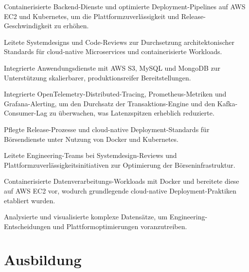 \documentclass[10pt,a4paper]{resume}
\begin{document}
\bullets
  \item Containerisierte Backend-Dienste und optimierte Deployment-Pipelines auf AWS EC2 und Kubernetes, um die Plattformzuverlässigkeit und Release-Geschwindigkeit zu erhöhen.
  \item Leitete Systemdesigns und Code-Reviews zur Durchsetzung architektonischer Standards für cloud-native Microservices und containerisierte Workloads.
  \item Integrierte Anwendungsdienste mit AWS S3, MySQL und MongoDB zur Unterstützung skalierbarer, produktionsreifer Bereitstellungen.
\bulletsend
\vspace{1.5pt}
\bullets
  \item Integrierte OpenTelemetry-Distributed-Tracing, Prometheus-Metriken und Grafana-Alerting, um den Durchsatz der Transaktions-Engine und den Kafka-Consumer-Lag zu überwachen, was Latenzspitzen erheblich reduzierte.
  \item Pflegte Release-Prozesse und cloud-native Deployment-Standards für Börsendienste unter Nutzung von Docker und Kubernetes.
  \item Leitete Engineering-Teams bei Systemdesign-Reviews und Plattformzuverlässigkeitsinitiativen zur Optimierung der Börseninfrastruktur.
\bulletsend
\vspace{1.5pt}
\bullets
  \item Containerisierte Datenverarbeitungs-Workloads mit Docker und bereitete diese auf AWS EC2 vor, wodurch grundlegende cloud-native Deployment-Praktiken etabliert wurden.
  \item Analysierte und visualisierte komplexe Datensätze, um Engineering-Entscheidungen und Plattformoptimierungen voranzutreiben.
\bulletsend
\vspace{1.5pt}

\section{Ausbildung}

\vspace{2pt}
\end{document}
